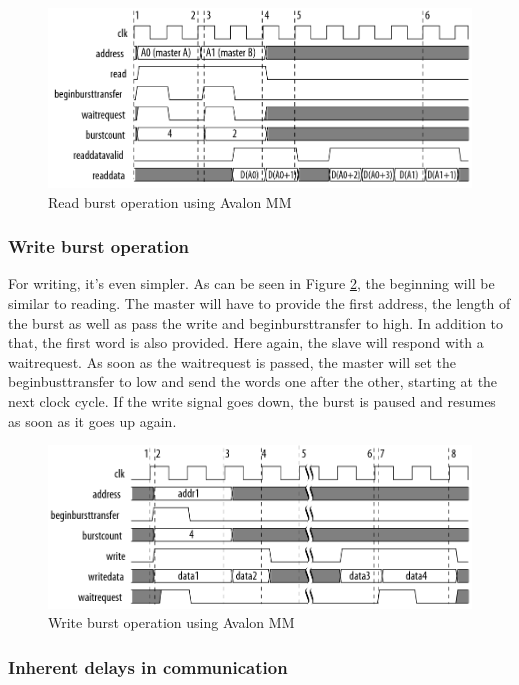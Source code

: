 \documentclass[12pt]{article}
\begin{document}
\begin{figure}[ht!]
  \center
  \includegraphics[width=12cm]{"res/chapter1/avalon_mm_read.png"}
  \caption{Read burst operation using Avalon MM}
  \label{fig:avalon_mm_read}
\end{figure}

\subsubsection{Write burst operation}

For writing, it's even simpler. As can be seen in Figure \ref{fig:avalon_mm_write}, the beginning will be similar to reading. The master will have to provide the first address, the length of the burst as well as pass the write and beginbursttransfer to high. In addition to that, the first word is also provided. Here again, the slave will respond with a waitrequest. As soon as the waitrequest is passed, the master will set the beginbusttransfer to low and send the words one after the other, starting at the next clock cycle. If the write signal goes down, the burst is paused and resumes as soon as it goes up again.

\begin{figure}[ht!]
  \center
  \includegraphics[width=12cm]{"res/chapter1/avalon_mm_write.png"}
  \caption{Write burst operation using Avalon MM}
  \label{fig:avalon_mm_write}
\end{figure}

\subsubsection{Inherent delays in communication}
\end{document}
